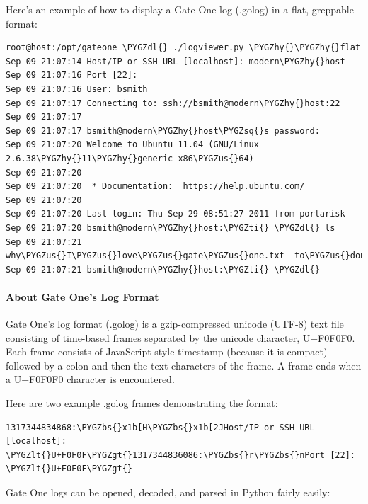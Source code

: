 \documentclass[letterpaper,10pt,openany]{sphinxmanual}
\def\PYGZbs{\char`\\}
\def\PYGZus{\char`\_}
\def\PYGZlt{\char`\<}
\def\PYGZgt{\char`\>}
\def\PYGZdl{\char`\$}
\def\PYGZhy{\char`\-}
\def\PYGZsq{\char`\'}
\def\PYGZti{\char`\~}
\begin{document}
Here's an example of how to display a Gate One log (.golog) in a flat, greppable
format:

\begin{Verbatim}[commandchars=\\\{\}]
root@host:/opt/gateone \PYGZdl{} ./logviewer.py \PYGZhy{}\PYGZhy{}flat
Sep 09 21:07:14 Host/IP or SSH URL [localhost]: modern\PYGZhy{}host
Sep 09 21:07:16 Port [22]:
Sep 09 21:07:16 User: bsmith
Sep 09 21:07:17 Connecting to: ssh://bsmith@modern\PYGZhy{}host:22
Sep 09 21:07:17
Sep 09 21:07:17 bsmith@modern\PYGZhy{}host\PYGZsq{}s password:
Sep 09 21:07:20 Welcome to Ubuntu 11.04 (GNU/Linux 2.6.38\PYGZhy{}11\PYGZhy{}generic x86\PYGZus{}64)
Sep 09 21:07:20
Sep 09 21:07:20  * Documentation:  https://help.ubuntu.com/
Sep 09 21:07:20
Sep 09 21:07:20 Last login: Thu Sep 29 08:51:27 2011 from portarisk
Sep 09 21:07:20 bsmith@modern\PYGZhy{}host:\PYGZti{} \PYGZdl{} ls
Sep 09 21:07:21 why\PYGZus{}I\PYGZus{}love\PYGZus{}gate\PYGZus{}one.txt  to\PYGZus{}dont\PYGZus{}list.txt
Sep 09 21:07:21 bsmith@modern\PYGZhy{}host:\PYGZti{} \PYGZdl{}
\end{Verbatim}


\paragraph{About Gate One's Log Format}
\label{Developer/logviewer:about-gate-one-s-log-format}
Gate One's log format (.golog) is a gzip-compressed unicode (UTF-8) text file
consisting of time-based frames separated by the unicode character, U+F0F0F0.
Each frame consists of JavaScript-style timestamp (because it is compact)
followed by a colon and then the text characters of the frame.  A frame ends
when a U+F0F0F0 character is encountered.

Here are two example .golog frames demonstrating the format:

\begin{Verbatim}[commandchars=\\\{\}]
1317344834868:\PYGZbs{}x1b[H\PYGZbs{}x1b[2JHost/IP or SSH URL [localhost]: \PYGZlt{}U+F0F0F\PYGZgt{}1317344836086:\PYGZbs{}r\PYGZbs{}nPort [22]: \PYGZlt{}U+F0F0F\PYGZgt{}
\end{Verbatim}

Gate One logs can be opened, decoded, and parsed in Python fairly easily:
\end{document}
